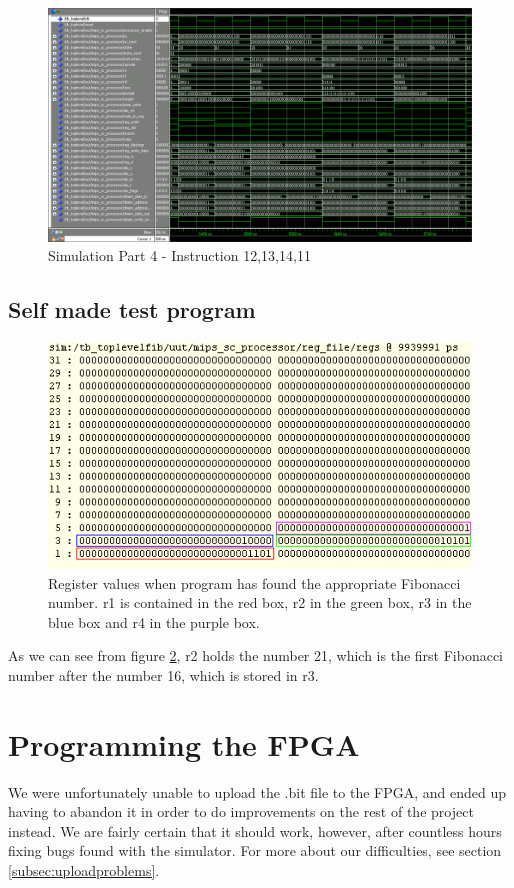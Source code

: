 \begin{figure}[ht]
    \centering
    \includegraphics[scale=0.36]{figures/sim4.png}
    \caption{\label{fig:sim4}Simulation Part 4 - Instruction 12,13,14,11}
\end{figure}

\clearpage

\subsection{Self made test program}
\begin{figure}[ht]
    \centering
    \includegraphics[scale=0.95]{figures/fibtest.png}
    \caption{\label{fig:fibsim}Register values when program has found the appropriate Fibonacci number. r1 is contained in the {\color{red} red box}, r2 in the {\color{green} green box}, r3 in the {\color{blue} blue box} and r4 in the {\color{magenta} purple box}.}
\end{figure}

As we can see from figure \ref{fig:fibsim}, r2 holds the number 21, which is the first Fibonacci number after the number 16, which is stored in r3.

\section{Programming the FPGA}
We were unfortunately unable to upload the .bit file to the FPGA, and ended up having to abandon it in order to do improvements on the rest of the project instead.
We are fairly certain that it should work, however, after countless hours fixing bugs found with the simulator.
For more about our difficulties, see section \ref{subsec:uploadproblems}.

